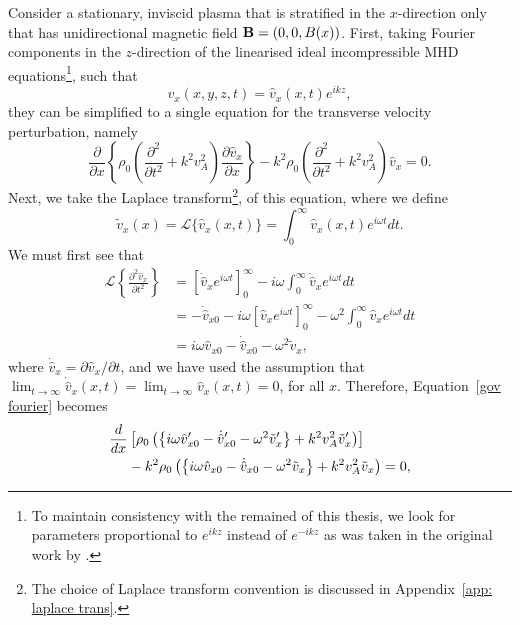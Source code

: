 \documentclass[12pt, draft]{../style-files/ociamthesis}
\begin{document}
Consider a stationary, inviscid plasma that is stratified in the $x$-direction only that has unidirectional magnetic field $\mathbf{B} = (0, 0, B(x))$. First, taking Fourier components in the $z$-direction of the linearised ideal incompressible MHD equations\footnote{To maintain consistency with the remained of this thesis, we look for parameters proportional to $e^{ikz}$ instead of $e^{-ikz}$ as was taken in the original work by \cite{rae_etal81}.}, such that
\begin{equation}
v_x(x,y,z,t) = \hat{v}_x(x,t)e^{ikz},
\end{equation}
they can be simplified to a single equation for the transverse velocity perturbation, namely
\begin{equation}
\frac{\partial}{\partial x}\left\{\rho_0\left(\frac{\partial^2}{\partial t^2} + k^2v_A^2\right) \frac{\partial\hat{v}_x}{\partial x}\right\} - k^2\rho_0\left(\frac{\partial^2}{\partial t^2} + k^2v_A^2\right)\hat{v}_x = 0.
\label{gov fourier}
\end{equation}
Next, we take the Laplace transform\footnote{The choice of Laplace transform convention is discussed in Appendix~\ref{app: laplace trans}.}, of this equation, where we define
\begin{equation}
\tilde{v}_x(x) = \mathcal{L}\{\hat{v}_x(x,t)\} = \int_0^\infty \hat{v}_x(x,t)e^{i\omega t} dt.
\end{equation}
We must first see that
\begin{align}
\mathcal{L}\left\{\frac{\partial^2 \hat{v}_x}{\partial t^2}\right\} & = \left[\dot{\hat{v}}_x e^{i\omega t}\right]_0^\infty - i\omega \int_0^\infty \dot{\hat{v}}_x e^{i\omega t} dt \\
& = -\dot{\hat{v}}_{x0} - i\omega\left[\hat{v}_x e^{i\omega t}\right]_0^\infty -\omega^2 \int_0^\infty \hat{v}_x e^{i\omega t} dt \\
& = i\omega \hat{v}_{x0} - \dot{\hat{v}}_{x0} - \omega^2 \tilde{v}_x,
\end{align}
where $\dot{\hat{v}}_x = \partial\hat{v}_x/\partial t$, and we have used the assumption that $\lim_{t \to \infty} \dot{\hat{v}}_{x}(x,t) = \lim_{t \to \infty} \hat{v}_{x}(x,t) = 0$, for all $x$. Therefore, Equation~\eqref{gov fourier} becomes
\begin{align}
\frac{d}{dx} &\left[\rho_0\left(\left\{i\omega \hat{v}_{x0}' - \dot{\hat{v}}_{x0}' - \omega^2\tilde{v}_x'\right\} + k^2v_A^2 \tilde{v}_x'\right)\right] \notag \\
&- k^2\rho_0 \left(\left\{i\omega \hat{v}_{x0} - \dot{\hat{v}}_{x0} - \omega^2\tilde{v}_x\right\} + k^2v_A^2 \tilde{v}_x\right) = 0, \notag
\end{align}
\end{document}
